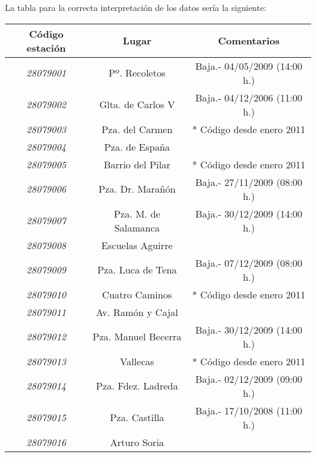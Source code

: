 La tabla para la correcta interpretación de los datos sería la siguiente:



\begin{table}[H]
			\begin{center}
	\begin{tabular}{|c|c|c|}
	
		\hline
		\textbf{Código estación} & \textbf{Lugar}       & \textbf{Comentarios}         \\ \hline
		\textit{28079001}        & Pº. Recoletos        & Baja.- 04/05/2009 (14:00 h.) \\ \hline
		\textit{28079002}        & Glta. de Carlos V    & Baja.- 04/12/2006 (11:00 h.) \\ \hline
		\textit{28079003}        & Pza. del Carmen      & * Código desde enero 2011    \\ \hline
		\textit{28079004}        & Pza. de España       &                              \\ \hline
		\textit{28079005}        & Barrio del Pilar     & * Código desde enero 2011    \\ \hline
		\textit{28079006}        & Pza. Dr. Marañón     & Baja.- 27/11/2009 (08:00 h.) \\ \hline
		\textit{28079007}        & Pza. M. de Salamanca & Baja.- 30/12/2009 (14:00 h.) \\ \hline
		\textit{28079008}        & Escuelas Aguirre     &                              \\ \hline
		\textit{28079009}        & Pza. Luca de Tena    & Baja.- 07/12/2009 (08:00 h.) \\ \hline
		\textit{28079010}        & Cuatro Caminos       & * Código desde enero 2011    \\ \hline
		\textit{28079011}        & Av. Ramón y Cajal    &                              \\ \hline
		\textit{28079012}        & Pza. Manuel Becerra  & Baja.- 30/12/2009 (14:00 h.) \\ \hline
		\textit{28079013}        & Vallecas             & * Código desde enero 2011    \\ \hline
		\textit{28079014}        & Pza. Fdez. Ladreda   & Baja.- 02/12/2009 (09:00 h.) \\ \hline
		\textit{28079015}        & Pza. Castilla        & Baja.- 17/10/2008 (11:00 h.) \\ \hline
		\textit{28079016}        & Arturo Soria         &                              \\ \hline

\end{tabular}
\end{center}
\end{table}
